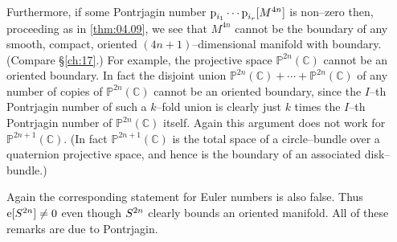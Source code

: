 \documentclass[../main]{subfiles}
\begin{document}
Furthermore, if some Pontrjagin number $\operatorname{p}_{i_1} \cdots \operatorname{p}_{i_r}[M^{4n}]$ is non--zero then, proceeding as in \ref{thm:04.09}, we see that $M^{4n}$ cannot be the boundary of any smooth, compact, oriented $(4n + 1)$--dimensional manifold with boundary. (Compare \S\ref{ch:17}.) For example, the projective space ${\mathbb P}^{2n}(\mathbb C)$ cannot be an oriented boundary. In fact the disjoint union ${\mathbb P}^{2n}(\mathbb C) + \cdots + {\mathbb P}^{2n}(\mathbb C)$ of any number of copies of ${\mathbb P}^{2n}(\mathbb C)$ cannot be an oriented boundary, since the $I$--th Pontrjagin number of such a $k$--fold union is clearly just $k$ times the $I$--th Pontrjagin number of ${\mathbb P}^{2n}(\mathbb C)$ itself. Again this argument does not work for ${\mathbb P}^{2n+1}(\mathbb C)$. (In fact ${\mathbb P}^{2n + 1}(\mathbb C)$ is the total space of a circle--bundle over a quaternion projective space, and hence is the boundary of an associated disk--bundle.)

Again the corresponding statement for Euler numbers is also false. Thus $\operatorname{e}[S^{2n}] \ne 0$ even though $S^{2n}$ clearly bounds an oriented manifold. All of these remarks are due to Pontrjagin. 
\end{document}

